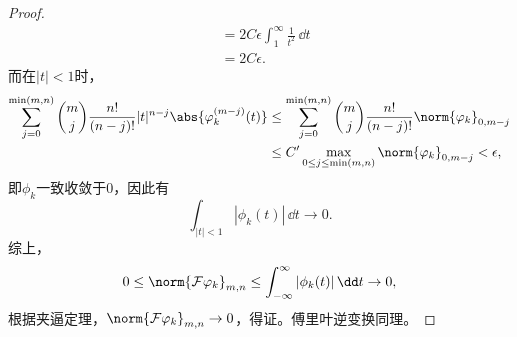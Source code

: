 \begin{proof}
\begin{align}
        &=2C\epsilon\int_{1}^{\infty}\frac{1}{t^2}\,\dd t \nonumber \\
        &=2C\epsilon.
    \end{align}
    而在$|t|<1$时，
    \begin{align}
        \sum_{j=0}^{\min(m,n)}\binom{m}{j}\frac{n!}{(n-j)!}|t|^{n-j}\abs{\varphi_k^{(m-j)}(t)}&\leq \sum_{j=0}^{\min(m,n)}\binom{m}{j}\frac{n!}{(n-j)!}\norm{\varphi_k}_{0,m-j} \nonumber \\
        &\leq C'\max_{0\leq j\leq \min(m,n)}\norm{\varphi_k}_{0,m-j}<\epsilon,
    \end{align}
    即$\phi_k$一致收敛于$0$，因此有
    \begin{equation}
        \int_{|t|<1}|\phi_k(t)|\,\dd t\to 0.
    \end{equation}
    综上，
    \begin{equation}
        0\leq\norm{\mathcal{F}\varphi_k}_{m,n}\leq\int_{-\infty}^{\infty}|\phi_k(t)|\,\dd t\to 0,
    \end{equation}
    根据夹逼定理，$\norm{\mathcal{F}\varphi_k}_{m,n}\to 0$，得证。傅里叶逆变换同理。
\end{proof}

